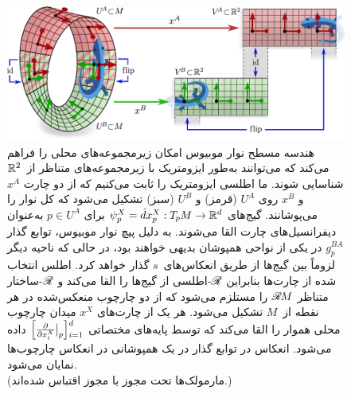 \begin{figure}
	\centering
	\includegraphics[width=\columnwidth]{figures/mobius_conv_gauges.pdf}
	\vspace*{.5ex}
	\caption{\small
		هندسه مسطح نوار موبیوس امکان زیرمجموعه‌های محلی را فراهم می‌کند که می‌توانند به‌طور ایزومتریک با زیرمجموعه‌های متناظر از~$\mathbb{R}^2$ شناسایی شوند.
		ما اطلسی ایزومتریک را ثابت می‌کنیم که از دو چارت $x^A$ و $x^B$ روی $U^A$ (قرمز) و $U^B$ (سبز) تشکیل می‌شود که کل نوار را می‌پوشانند.
		گیج‌های $\psi_p^X = \hat{d}x_p^X: T_{\mkern-1.5mu p}\mkern-.5muM \to \mathbb{R}^d$ برای $p\in U^A$ به‌عنوان دیفرانسیل‌های چارت القا می‌شوند.
		به دلیل پیچ نوار موبیوس، توابع گذار $g_p^{BA}$ در یکی از نواحی همپوشان بدیهی خواهند بود، در حالی که ناحیه دیگر لزوماً بین گیج‌ها از طریق انعکاس‌های~$s$ گذار خواهد کرد.
		اطلس انتخاب شده از چارت‌ها بنابراین $\mathscr{R}$-اطلسی از گیج‌ها را القا می‌کند و $\mathscr{R}$-ساختار متناظر $\mathscr{R}\mkern-1.8muM$ را مستلزم می‌شود که از دو چارچوب منعکس‌شده در هر نقطه از~$M$ تشکیل می‌شود.
		هر یک از چارت‌های $x^X$ میدان چارچوب محلی هموار را القا می‌کند که توسط پایه‌های مختصاتی
		$\Big[\frac{\partial}{\partial x_i^X} \mkern-1mu\big|_p \Big] \raisebox{-2pt}{$\rule{0pt}{11pt}_{i=1}^d$}$
		داده می‌شود.
		انعکاس در توابع گذار در یک همپوشانی در انعکاس چارچوب‌ها نمایان می‌شود.
		{
			\\ \color{gray} \scriptsize
			(مارمولک‌ها تحت مجوز 
			\href{https://github.com/twitter/twemoji/blob/gh-pages/LICENSE-GRAPHICS}{\underline{}}
			با مجوز  اقتباس شده‌اند.)
		}
	}
	\label{fig:mobius_conv_gauges}
\end{figure}

